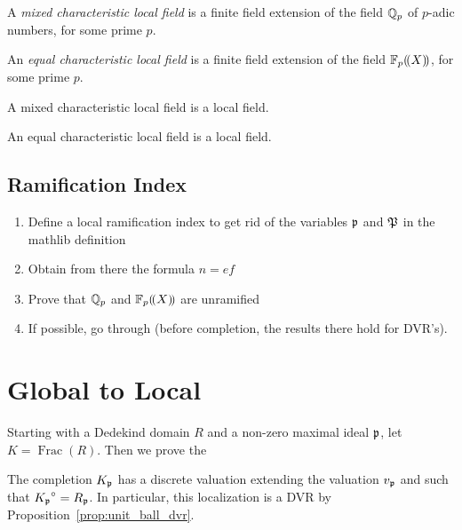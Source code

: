 \begin{c}
\begin{def}
	\label{mixed_char_local_field}
	\leanok
	A \textit{mixed characteristic local field} is a finite field extension of the field 
	$\Qp$ of $p$-adic numbers, for some prime $p$.
\end{def}

\begin{def}
	\label{eq_char_local_field}
	\leanok
	An \textit{equal characteristic local field} is a finite field extension of the field 
	$\laurentseries$, for some prime $p$.
\end{def}

\begin{lemma}
	\label{mixed_char_local_field.local_field}
	A mixed characteristic local field is a local field.
\end{lemma}

\begin{lemma}
	\label{eq_char_local_field.local_field}
	An equal characteristic local field is a local field.
\end{lemma}
\subsection{Ramification Index}
\begin{enumerate}
	\item Define a local ramification index to get rid of the variables $\primeid$ and $\primeid[P]$ in the mathlib definition
	\item Obtain from there the formula $n=ef$
	\item Prove that $\Qp$ and $\laurentseries$ are unramified
	\item If possible, go through \cite[Chap. I, \S6]{Se2} (before completion, the results there hold for DVR's).
\end{enumerate}
\section{Global to Local}
Starting with a Dedekind domain $R$ and a non-zero maximal ideal $\primeid$, let $K=\operatorname{Frac}(R)$. Then we prove the
\begin{proposition}
	\label{prop:extension_equal}
	The completion $K_{\primeid}$ has a discrete valuation extending the valuation $v_{\primeid}$ and such that $\unitball{K_{\primeid}}=R_{\primeid}$. In particular, this localization is a DVR by Proposition~\ref{prop:unit_ball_dvr}.
\end{proposition}


\end{c}
